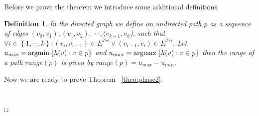 \documentclass[11pt]{article}
\newtheorem{definition}[theorem]{Definition}
\newcommand{\sq}{\hbox{\rlap{$\sqcap$}$\sqcup$}}
\newcommand{\qed}{\hspace*{\fill}\sq}
\newenvironment{proof}{\noindent {\bf Proof.}\ }{\qed\par\vskip 4mm\par}
\def\argmin{{\rm argmin}}
\def\argmax{{\rm argmax}}
\begin{document}
Before we prove the theorem we introduce some additional definitions.

\begin{definition}
In the directed graph we define an \emph{undirected path} $p$ as a sequence of edges $(v_0,v_1),(v_1,v_2),$ \newline $\cdots , (v_{k-1},v_k$), such that $\forall i \in \left\{1,\cdots ,k\right\}:(v_i,v_{i-1})\in E^{Tri} \vee (v_{i-1},v_i)\in E^{Tri}$. Let $u_{min}=\argmin \left\{h(v): v \in p\right\}$ and $u_{max}=\argmax \left\{h(v): v \in p\right\}$ then the \emph{range of a path} $range(p)$ is given by $range(p)=u_{max}-u_{min}$.
\end{definition}

Now we are ready to prove Theorem ~\ref{theo:phase2}.

\begin{proof}

\end{proof}
\end{document}
